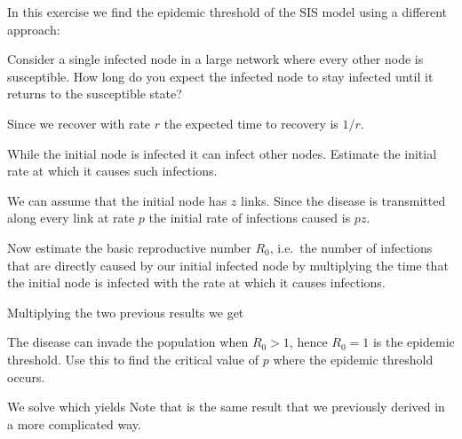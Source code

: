 In this exercise we find the epidemic threshold of the SIS model using a different approach:

\subquestion Consider a single infected node in a large network where every other node is susceptible. How long do you expect the infected node to stay infected until it returns to the susceptible state?

\solution
Since we recover with rate $r$ the expected time to recovery is $1/r$.

\subquestion While the initial node is infected it can infect other nodes. Estimate the initial rate at which it causes such infections. 

\solution
We can assume that the initial node has $z$ links. Since the disease is transmitted along every link at rate $p$ the initial rate of infections caused is $pz$.

\subquestion 
Now estimate the basic reproductive number $R_0$, i.e.~the number of infections that are directly caused by our initial infected node by multiplying the time that the initial node is infected with the rate at which it causes infections. 

\solution
Multiplying the two previous results we get 

\subquestion The disease can invade the population when $R_0>1$, hence $R_0=1$ is the epidemic threshold. Use this to find the critical value of $p$ where the epidemic threshold occurs. 

\solution 
We solve 
which yields
Note that is the same result that we previously derived in a more complicated way. 